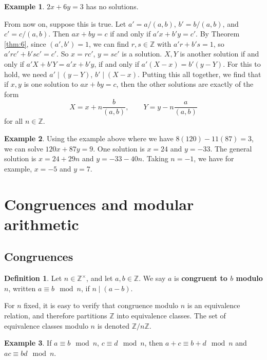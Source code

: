 \documentclass{article}
\newcommand{\Z}{\mathbb{Z}}
\newcommand{\rb}[1]{\left( #1 \right)}
\theoremstyle{definition}\newtheorem{definition}{Definition}
\theoremstyle{definition}\newtheorem*{remark}{Remark}
\theoremstyle{definition}\newtheorem*{example}{Example}
\theoremstyle{definition}\newtheorem*{note}{Note}
\begin{document}
\begin{example}
$ 2x + 6y = 3 $ has no solutions.
\end{example}

From now on, suppose this is true. Let $ a' = a / \rb{a, b} $, $ b' = b / \rb{a, b} $, and $ c' = c / \rb{a, b} $. Then $ ax + by = c $ if and only if $ a'x + b'y = c' $. By Theorem \ref{thm:6}, since $ \rb{a', b'} = 1 $, we can find $ r, s \in \Z $ with $ a'r + b's = 1 $, so $ a'rc' + b'sc' = c' $. So $ x = rc' $, $ y = sc' $ is a solution. $ X, Y $ is another solution if and only if $ a'X + b'Y = a'x + b'y $, if and only if $ a'\rb{X - x} = b'\rb{y - Y} $. For this to hold, we need $ a' \mid \rb{y - Y} $, $ b' \mid \rb{X - x} $. Putting this all together, we find that if $ x, y $ is one solution to $ ax + by = c $, then the other solutions are exactly of the form
$$ X = x + n\dfrac{b}{\rb{a, b}}, \qquad Y = y - n\dfrac{a}{\rb{a, b}} $$
for all $ n \in \Z $.

\begin{example}
Using the example above where we have $ 8\rb{120} - 11\rb{87} = 3 $, we can solve $ 120x + 87y = 9 $. One solution is $ x = 24 $ and $ y = -33 $. The general solution is $ x = 24 + 29n $ and $ y = -33 - 40n $. Taking $ n = -1 $, we have for example, $ x = -5 $ and $ y = 7 $.
\end{example}

\section{Congruences and modular arithmetic}

\subsection{Congruences}

\begin{definition}
Let $ n \in \Z^\times $, and let $ a, b \in \Z $. We say $ a $ is \textbf{congruent to $ b $ modulo $ n $}, written $ a \equiv b \mod n $, if $ n \mid \rb{a - b} $.
\end{definition}

For $ n $ fixed, it is easy to verify that congruence modulo $ n $ is an equivalence relation, and therefore partitions $ \Z $ into equivalence classes. The set of equivalence classes modulo $ n $ is denoted $ \Z / n\Z $.

\begin{example}
If $ a \equiv b \mod n $, $ c \equiv d \mod n $, then $ a + c \equiv b + d \mod n $ and $ ac \equiv bd \mod n $.
\end{example}
\end{document}
